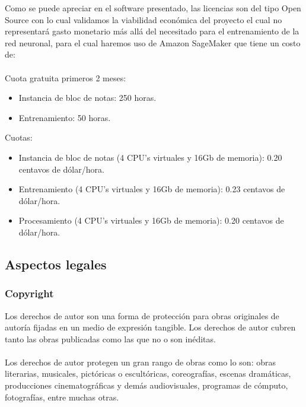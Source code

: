 \documentclass[12pt, a4paper, titlepage]{report}
\begin{document}
    	Como se puede apreciar en el software presentado, las licencias son del tipo Open Source con lo cual validamos la viabilidad económica del proyecto el cual no representará gasto monetario más allá del necesitado para el entrenamiento de la red neuronal, para el cual haremos uso de Amazon SageMaker que tiene un costo de:\\\\
    	Cuota gratuita primeros 2 meses:
    	\begin{itemize}
    		\item Instancia de bloc de notas: 250 horas.
    		\item Entrenamiento: 50 horas. 
    	\end{itemize}
    	Cuotas:
    	\begin{itemize}
    		\item Instancia de bloc de notas (4 CPU's virtuales y 16Gb de memoria): 0.20 centavos de dólar/hora.
    		\item Entrenamiento (4 CPU's virtuales y 16Gb de memoria): 0.23 centavos de dólar/hora.
    		\item Procesamiento (4 CPU's virtuales y 16Gb de memoria): 0.20 centavos de dólar/hora.
    	\end{itemize}	
    	
    	\subsection{Aspectos legales}
    	\subsubsection*{Copyright}
    	Los derechos de autor son una forma de protección para obras originales de autoría fijadas en un medio de expresión tangible. Los derechos de autor cubren tanto las obras publicadas como las que no o son inéditas.\cite{refCopyright}\\\\
    	Los derechos de autor protegen un gran rango de obras como lo son: obras literarias, musicales, pictóricas o escultóricas, coreografías, escenas dramáticas, producciones cinematográficas y demás audiovisuales, programas de cómputo, fotografías, entre muchas otras.
\end{document}
